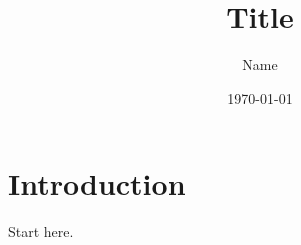 \documentclass[12pt, a4paper]{article}
\title{Title}
\author{Name}
\date{\today}
\begin{document}
\maketitle

\section{Introduction}
Start here.

\printbibliography
\end{document}
